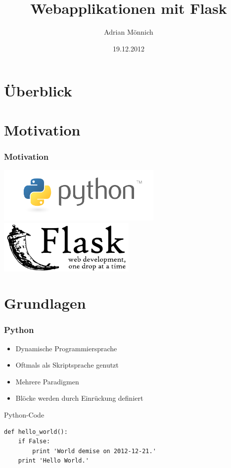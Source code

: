 \documentclass{beamer}
\date{19.12.2012}
\title{Webapplikationen mit Flask}
\author{Adrian Mönnich}
\institute[Hochschule Karlsruhe]{
  Fakultät für Informatik und Wirtschaftsinformatik\\
  Hochschule Karlsruhe
}
\begin{document}
\maketitle
\section*{Überblick}
\frame{\tableofcontents}


\section{Motivation}
\begin{frame}
  \frametitle{Motivation}
  \includegraphics[width=0.6\textwidth]{images/python-logo.png} \hspace*{\fill}
  \newline
  \hspace*{\fill} \includegraphics[width=0.5\textwidth]{images/flask-logo.pdf}
\end{frame}


\section{Grundlagen}
\begin{frame}[fragile]
  \frametitle{Python}
  \begin{itemize}
    \item Dynamische Programmiersprache
    \item Oftmals als Skriptsprache genutzt
    \item Mehrere Paradigmen
    \item Blöcke werden durch Einrückung definiert
  \end{itemize}

  \begin{exampleblock}{Python-Code}
    \begin{lstlisting}
def hello_world():
    if False:
        print 'World demise on 2012-12-21.'
    print 'Hello World.'
    \end{lstlisting}
  \end{exampleblock}
\end{frame}
\end{document}
